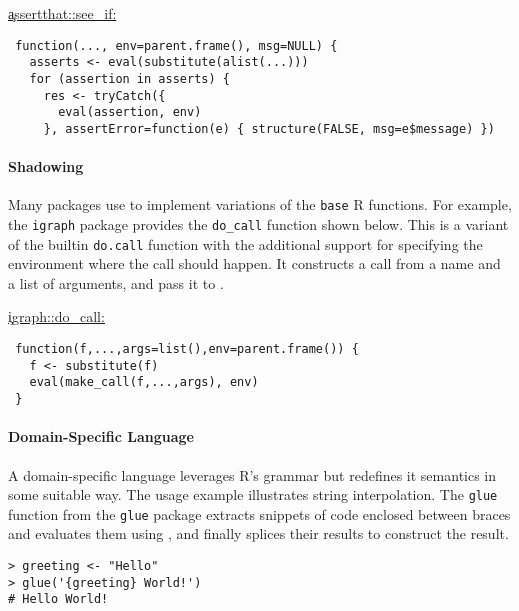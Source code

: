 \documentclass[screen,acmsmall]{acmart}%
\renewcommand{\k}[1]{\lstinline |#1|\xspace}
\begin{document}
\begin{minipage}{.95\textwidth}
  \medskip\underline{\c {assertthat::see\_if}:}
\begin{lstlisting}
 function(..., env=parent.frame(), msg=NULL) {
   asserts <- eval(substitute(alist(...)))
   for (assertion in asserts) {
     res <- tryCatch({
       eval(assertion, env)
     }, assertError=function(e) { structure(FALSE, msg=e$message) })
\end{lstlisting}\medskip
\end{minipage}

\paragraph{Shadowing}
Many packages use \eval to implement variations of the \k{base} R functions.
For example, the \k{igraph} package provides the \k{do_call} function shown
below. This is a variant of the builtin \k{do.call} function with the
additional support for specifying the environment where the call should happen.
It constructs a call from a name and a list of arguments, and pass it to \eval.

\begin{minipage}{.95\textwidth}
  \medskip\underline{\c{igraph::do\_call}:}
\begin{lstlisting}
 function(f,...,args=list(),env=parent.frame()) {
   f <- substitute(f)
   eval(make_call(f,...,args), env)
 }
\end{lstlisting}\medskip
\end{minipage}

\paragraph{Domain-Specific Language}
A domain-specific language leverages R's grammar but redefines it semantics in
some suitable way. The usage example illustrates string interpolation. The
\k{glue} function from the \k{glue} package extracts snippets of code enclosed
between braces and evaluates them using \eval, and finally splices their
results to construct the result.

\begin{minipage}{.95\textwidth}
\medskip
\begin{lstlisting}
> greeting <- "Hello"
> glue('{greeting} World!') 
# Hello World!
\end{lstlisting}\medskip
\end{minipage}
\end{document}
